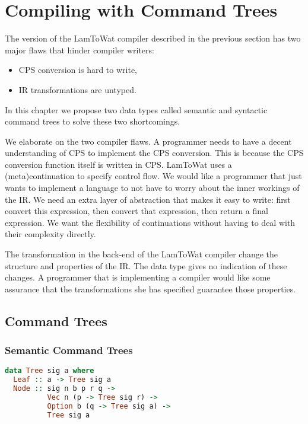 
\chapter{\label{chap:treecomp}Compiling with Command Trees}
The version of the LamToWat compiler described in the previous section has two major flaws that hinder compiler writers:

\begin{itemize}
\item \ac{CPS} conversion is hard to write,
\item \ac{IR} transformations are untyped.
\end{itemize}

In this chapter we propose two data types called semantic and syntactic command trees to solve these two shortcomings.

We elaborate on the two compiler flaws. A programmer needs to have a decent understanding of \ac{CPS} to implement the \ac{CPS} conversion. This is because the \ac{CPS} conversion function itself is written in \ac{CPS}. LamToWat uses a (meta)continuation to specify control flow. We would like a programmer that just wants to implement a language to not have to worry about the inner workings of the \ac{IR}. We need an extra layer of abstraction that makes it easy to write: first convert this expression, then convert that expression, then return a final expression. We want the flexibility of continuations without having to deal with their complexity directly.

The transformation in the back-end of the LamToWat compiler change the structure and properties of the \ac{IR}. The  data type gives no indication of these changes. A programmer that is implementing a compiler would like some assurance that the transformations she has specified guarantee those properties.

\section{\label{section:commandtree}Command Trees}
\subsection{\label{subsection:semantree}Semantic Command Trees}
\begin{lstlisting}[language=Haskell]
data Tree sig a where
  Leaf :: a -> Tree sig a
  Node :: sig n b p r q ->
          Vec n (p -> Tree sig r) ->
          Option b (q -> Tree sig a) ->
          Tree sig a
\end{lstlisting}

